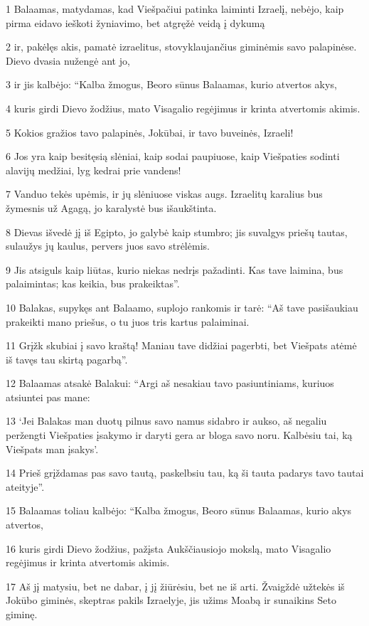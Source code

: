 \par 1 Balaamas, matydamas, kad Viešpačiui patinka laiminti Izraelį, nebėjo, kaip pirma eidavo ieškoti žyniavimo, bet atgręžė veidą į dykumą 
\par 2 ir, pakėlęs akis, pamatė izraelitus, stovyklaujančius giminėmis savo palapinėse. Dievo dvasia nužengė ant jo, 
\par 3 ir jis kalbėjo: “Kalba žmogus, Beoro sūnus Balaamas, kurio atvertos akys, 
\par 4 kuris girdi Dievo žodžius, mato Visagalio regėjimus ir krinta atvertomis akimis. 
\par 5 Kokios gražios tavo palapinės, Jokūbai, ir tavo buveinės, Izraeli! 
\par 6 Jos yra kaip besitęsią slėniai, kaip sodai paupiuose, kaip Viešpaties sodinti alavijų medžiai, lyg kedrai prie vandens! 
\par 7 Vanduo tekės upėmis, ir jų slėniuose viskas augs. Izraelitų karalius bus žymesnis už Agagą, jo karalystė bus išaukštinta. 
\par 8 Dievas išvedė jį iš Egipto, jo galybė kaip stumbro; jis suvalgys priešų tautas, sulaužys jų kaulus, pervers juos savo strėlėmis. 
\par 9 Jis atsiguls kaip liūtas, kurio niekas nedrįs pažadinti. Kas tave laimina, bus palaimintas; kas keikia, bus prakeiktas”. 
\par 10 Balakas, supykęs ant Balaamo, suplojo rankomis ir tarė: “Aš tave pasišaukiau prakeikti mano priešus, o tu juos tris kartus palaiminai. 
\par 11 Grįžk skubiai į savo kraštą! Maniau tave didžiai pagerbti, bet Viešpats atėmė iš tavęs tau skirtą pagarbą”. 
\par 12 Balaamas atsakė Balakui: “Argi aš nesakiau tavo pasiuntiniams, kuriuos atsiuntei pas mane: 
\par 13 ‘Jei Balakas man duotų pilnus savo namus sidabro ir aukso, aš negaliu peržengti Viešpaties įsakymo ir daryti gera ar bloga savo noru. Kalbėsiu tai, ką Viešpats man įsakys’. 
\par 14 Prieš grįždamas pas savo tautą, paskelbsiu tau, ką ši tauta padarys tavo tautai ateityje”. 
\par 15 Balaamas toliau kalbėjo: “Kalba žmogus, Beoro sūnus Balaamas, kurio akys atvertos, 
\par 16 kuris girdi Dievo žodžius, pažįsta Aukščiausiojo mokslą, mato Visagalio regėjimus ir krinta atvertomis akimis. 
\par 17 Aš jį matysiu, bet ne dabar, į jį žiūrėsiu, bet ne iš arti. Žvaigždė užtekės iš Jokūbo giminės, skeptras pakils Izraelyje, jis užims Moabą ir sunaikins Seto giminę. 
